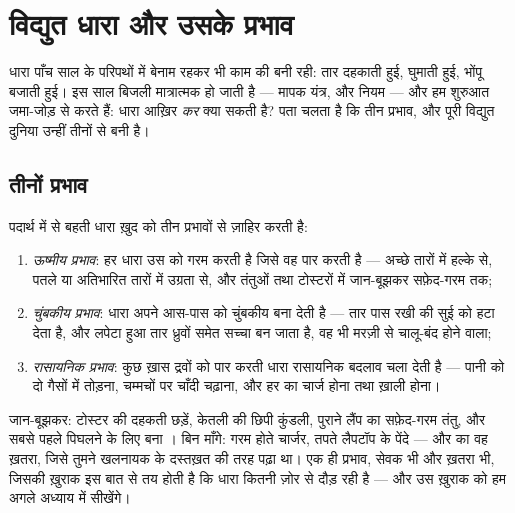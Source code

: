\chapter{विद्युत धारा और उसके प्रभाव}\label{ch:g8:electric-current-effects}

धारा पाँच साल के परिपथों में बेनाम रहकर भी काम की बनी रही: तार दहकाती
हुई,  घुमाती हुई, भोंपू बजाती हुई। इस साल बिजली मात्रात्मक हो जाती
है --- मापक यंत्र,  और नियम --- और हम शुरुआत जमा-जोड़ से करते
हैं: धारा आख़िर \emph{कर} क्या सकती है? पता चलता है कि तीन प्रभाव, और
पूरी विद्युत दुनिया उन्हीं तीनों से बनी है।

\section{तीनों प्रभाव}

\begin{proposition}[विद्युत धारा के प्रभाव]\label{prop:g8:electric-current-effects:three}
पदार्थ में से बहती धारा ख़ुद को तीन प्रभावों से ज़ाहिर करती है:
\begin{enumerate}
  \item \emph{ऊष्मीय प्रभाव}: हर धारा उस  को
        गरम करती है जिसे वह पार करती है --- अच्छे तारों में हल्के से,
        पतले या अतिभारित तारों में उग्रता से, और तंतुओं तथा टोस्टरों
        में जान-बूझकर सफ़ेद-गरम तक;
  \item \emph{चुंबकीय प्रभाव}: धारा अपने
        आस-पास को चुंबकीय बना देती है --- तार पास रखी  की सुई
        को हटा देता है, और लपेटा हुआ तार ध्रुवों समेत सच्चा  बन
        जाता है, वह भी मरज़ी से चालू-बंद होने वाला;
  \item \emph{रासायनिक प्रभाव}: कुछ ख़ास द्रवों
        को पार करती धारा रासायनिक बदलाव चला देती है --- पानी को दो
        गैसों में तोड़ना, चम्मचों पर चाँदी चढ़ाना, और हर  का
        चार्ज होना तथा ख़ाली होना।
\end{enumerate}
\end{proposition}

\begin{example}[ऊष्मीय प्रभाव काम पर]\label{ex:g8:electric-current-effects:heating}
जान-बूझकर: टोस्टर की दहकती छड़ें, केतली की छिपी कुंडली, पुराने लैंप
का सफ़ेद-गरम तंतु, और सबसे पहले पिघलने के लिए बना । बिन माँगे:
गरम होते चार्जर, तपते लैपटॉप के पेंदे --- और  का वह ख़तरा, जिसे
तुमने खलनायक के दस्तख़त की तरह पढ़ा था। एक ही प्रभाव, सेवक भी और ख़तरा
भी, जिसकी ख़ुराक इस बात से तय होती है कि धारा कितनी ज़ोर से दौड़ रही
है --- और उस ख़ुराक को \emph{} हम अगले अध्याय में सीखेंगे।
\end{example}

